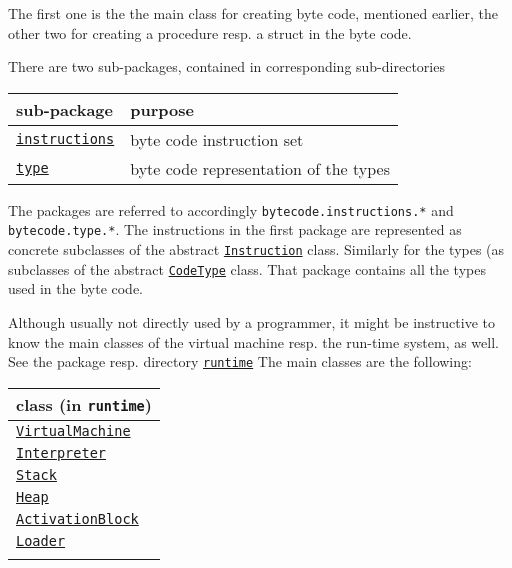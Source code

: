 \documentclass[11pt]{article}
\begin{document}
The first one is the the main class for creating byte code, mentioned
earlier, the other two for creating a procedure resp. a struct in the byte
code.


There are two sub-packages, contained in corresponding sub-directories


\begin{center}
\begin{tabular}{ll}
sub-package & purpose\\
\hline
\href{../../bytecode/./instructions/}{\texttt{instructions}} & byte code instruction set\\
\href{../../bytecode/type/}{\texttt{type}} & byte code representation of the types\\
\hline
\end{tabular}

\end{center}


The packages are referred to accordingly \texttt{bytecode.instructions.*} and
\texttt{bytecode.type.*}.  The instructions in the first package are represented
as concrete subclasses of the abstract \href{../../bytecode/./instructions/Instruction.java}{\texttt{Instruction}} class.  Similarly for
the types (as subclasses of the abstract \href{../../bytecode/./type/CodeType.java}{\texttt{CodeType}} class. That package
contains all the types used in the byte code.

Although usually not directly used by a programmer, it might be instructive
to know the main classes of the virtual machine resp. the run-time system,
as well. See the package resp. directory \href{../../runtime/}{\texttt{runtime}} The main classes are the
following:

\begin{center}
\begin{tabular}{l}
class (in \texttt{runtime})\\
\hline
\href{../../runtime/VirtualMachine.java}{\texttt{VirtualMachine}}\\
\href{../../runtime/Interpreter.java}{\texttt{Interpreter}}\\
\href{../../runtime/Stack.java}{\texttt{Stack}}\\
\href{../../runtime/Heap.java}{\texttt{Heap}}\\
\href{../../runtime/ActivationBlock.java}{\texttt{ActivationBlock}}\\
\href{../../runtime/Loader.java}{\texttt{Loader}}\\
\\
\end{tabular}

\end{center}
\end{document}
